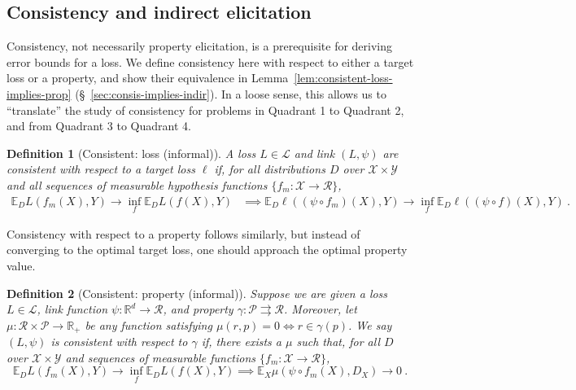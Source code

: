 \documentclass{article} %
\newcommand{\reals}{\mathbb{R}}
\newcommand{\propdis}{\mu}
\newcommand{\E}{\mathbb{E}}
\renewcommand{\L}{\mathcal{L}}
\newcommand{\R}{\mathcal{R}}
\renewcommand{\P}{\mathcal{P}}
\newcommand{\X}{\mathcal{X}}
\newcommand{\Y}{\mathcal{Y}}
\newcommand{\toto}{\rightrightarrows}
\newtheorem{definition}{Definition}
\begin{document}
\subsection{Consistency and indirect elicitation}

Consistency, not necessarily property elicitation, is a prerequisite for deriving error bounds for a loss.
We define consistency here with respect to either a target loss or a property, and show their equivalence in Lemma~\ref{lem:consistent-loss-implies-prop} (\S~\ref{sec:consis-implies-indir}).
In a loose sense, this allows us to ``translate'' the study of consistency for problems in Quadrant 1 to Quadrant 2, and from Quadrant 3 to Quadrant 4.


\begin{definition}[Consistent: loss (informal)]\label{def:consistent-ell-informal}
	A loss $L \in \L$ and link $(L,\psi)$ are \emph{consistent} with respect to a target loss $\ell$ if, for all distributions $D$ over $\X \times \Y$ and all sequences of measurable hypothesis functions $\{f_m : \X \to \R\}$,
	\begin{align*}
	\E_D L(f_m(X), Y) \to \inf_f \E_D L(f(X), Y) &\implies \E_D \ell((\psi \circ f_m)(X), Y) \to \inf_f \E_D \ell((\psi \circ f)(X), Y)~.~
	\end{align*}
\end{definition}

Consistency with respect to a property follows similarly, but instead of converging to the optimal target loss, one should approach the optimal property value.

\begin{definition}[Consistent: property (informal)]\label{def:consistent-prop-informal}
	Suppose we are given a loss $L \in \L$, link function $\psi: \reals^d \to \R$, and property $\gamma:\P \toto \R$.
	Moreover, let $\propdis : \R \times \P \to \reals_+$ be any function satisfying $\propdis(r,p) = 0 \iff r \in \gamma(p)$.
	We say $(L, \psi)$ is \emph{consistent} with respect to $\gamma$ if, there exists a $\propdis$ such that, for all $D$ over $\X \times\Y$ and sequences of measurable functions $\{f_m: \X \to \R\}$, 
	\begin{equation}
	\E_{D} L(f_m(X), Y) \to \inf_f \E_{D} L( f(X), Y) \implies \E_X \propdis(\psi \circ f_m(X), D_X) \to 0~.~
	\end{equation}
\end{definition}
\end{document}
